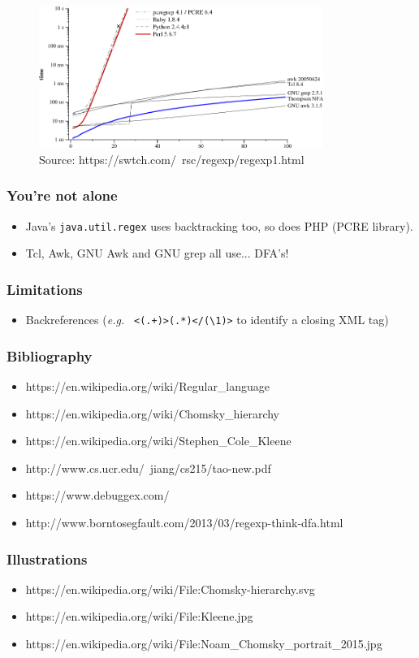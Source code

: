 \documentclass[aspectratio=169,xcolor=table]{beamer}
\newcommand{\ctexttt}[1]{\colorbox{cverbbg}{\texttt{#1}}}
\begin{document}
\begin{frame}
  \begin{figure}
    \includegraphics[width=350px]{images/grep1p.png}
    \caption{\label{fig. 1} Source: https://swtch.com/~rsc/regexp/regexp1.html}
  \end{figure}
\end{frame}


\begin{frame}
  \frametitle{You're not alone}
  \begin{itemize}
  \item Java's \ctexttt{java.util.regex} uses backtracking too, so does PHP
    (PCRE library).
  \item Tcl, Awk, GNU Awk and GNU grep all use... DFA's!
  \end{itemize}
\end{frame}


\begin{frame}
  \frametitle{Limitations}
  \begin{itemize}
    \item Backreferences (\textit{e.g.} \ctexttt{
        <(.+)>(.*)</(\textbackslash1)>} to identify a closing XML tag)
  \end{itemize}
\end{frame}


\begin{frame}
  \frametitle{Bibliography}
  \begin{itemize}
    \item https://en.wikipedia.org/wiki/Regular\_language
    \item https://en.wikipedia.org/wiki/Chomsky\_hierarchy
    \item https://en.wikipedia.org/wiki/Stephen\_Cole\_Kleene
    \item http://www.cs.ucr.edu/~jiang/cs215/tao-new.pdf
    \item https://www.debuggex.com/
    \item http://www.borntosegfault.com/2013/03/regexp-think-dfa.html
  \end{itemize}
\end{frame}


\begin{frame}
  \frametitle{Illustrations}
  \begin{itemize}
    \item https://en.wikipedia.org/wiki/File:Chomsky-hierarchy.svg
    \item https://en.wikipedia.org/wiki/File:Kleene.jpg
    \item https://en.wikipedia.org/wiki/File:Noam\_Chomsky\_portrait\_2015.jpg
  \end{itemize}
\end{frame}
\end{document}
